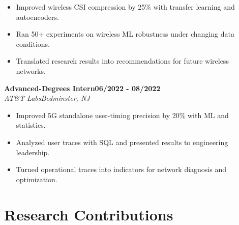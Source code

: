 \documentclass[9pt,letterpaper]{extarticle}
\newcommand{\role}[4]{%
  \Needspace{4\baselineskip}\textbf{#1}\hfill\textbf{#2}\\[-1pt]
  \textit{#3}\hfill\textit{#4}\par}
\begin{document}
\begin{itemize}
\item Improved wireless CSI compression by 25\% with transfer learning and autoencoders.
\item Ran 50+ experiments on wireless ML robustness under changing data conditions.
\item Translated research results into recommendations for future wireless networks.
\end{itemize}
\vspace{1pt}
\role{Advanced-Degrees Intern}{06/2022 - 08/2022}{AT\&T Labs}{Bedminster, NJ}
\begin{itemize}
\item Improved 5G standalone user-timing precision by 20\% with ML and statistics.
\item Analyzed user traces with SQL and presented results to engineering leadership.
\item Turned operational traces into indicators for network diagnosis and optimization.
\end{itemize}
\vspace{1pt}
\section{Research Contributions}
\end{document}
